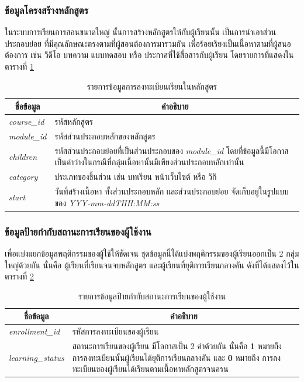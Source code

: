 \documentclass[conference]{IEEEtran}
\def\moocs{การเรียนการสอนขนาดใหญ่}
\def\MOOCs{ระบบ{\moocs}}
\def\dropout{ยุติการเรียนกลางคัน}
\newcommand*{\thead}[1]{\multicolumn{1}{c}{\bfseries #1}}
\begin{document}
    \subsubsection{ข้อมูลโครงสร้างหลักสูตร}
    ใน{\MOOCs} นั้นการสร้างหลักสูตรให้กับผู้เรียนนั้น เป็นการนำเอาส่วนประกอบย่อย 
    ที่มีคุณลักษณะตรงตามที่ผู้สอนต้องการมารวมกัน เพื่อร้อยเรียงเป็นเนื้อหาตามที่ผู้สนอต้องการ
    เช่น วีดีโอ บทความ แบบทดสอบ หรือ ประกาศที่ใช้สื่อสารกับผู้เรียน 
    โดยรายการที่แสดงในตารางที่ \ref{tab:course-structure-feature}

    \begin{table}[ht!]
        \caption[coursestructureinfo]{รายการข้อมูลการลงทะเบียนเรียนในหลักสูตร}
        \label{tab:course-structure-feature}
        \begin{tabular}{p{3cm} p{5cm}}
            \hline
            \thead{ชื่อข้อมูล} & \thead{คำอธิบาย} \\
            \hline
            \textit{course\_id}     & รหัสหลักสูตร \\
            \textit{module\_id}     & รหัสส่วนประกอบหลักของหลักสูตร \\
            \textit{children}       & รหัสส่วนประกอบย่อยที่เป็นส่วนประกอบของ \textit{module\_id} โดยที่ข้อมูลนี้มีโอกาสเป็นค่าว่างในกรณีที่กลุ่มเนื้อหานั้นมีเพียงส่วนประกอบหลักเท่านั้น \\
            \textit{category}       & ประเภทของชิ้นส่วน เช่น บทเรียน หน้าเว็บไซต์ หรือ วิกิ \\
            \textit{start}          & วันที่สร้างเนื้อหา ทั้งส่วนประกอบหลัก และส่วนประกอบย่อย จัดเก็บอยู่ในรูปแบบของ \textit{YYY-mm-ddTHH:MM:ss}\\
            \hline
        \end{tabular}
    \end{table}

    \subsubsection{ข้อมูลป้ายกำกับสถานะการเรียนของผู้ใช้งาน}
    เพื่อแบ่งแยกข้อมูลพฤติกรรมของผู้ใช้ให้ชัดเจน ชุดข้อมูลนี้ได้แบ่งพฤติกรรมของผู้เรียนออกเป็น 2 กลุ่มใหญ่ด้วยกัน นั่นคือ ผู้เรียนที่เรียนจนจบหลักสูตร
    และผู้เรียนที่{\dropout} ดังที่ได้แสดงไว้ในตารางที่ \ref{tab:enrollment-label-feature}
    \begin{table}[ht!]
        \caption[enrollmentlabelinfo]{รายการข้อมูลป้ายกำกับสถานะการเรียนของผู้ใช้งาน}
        \label{tab:enrollment-label-feature}
        \begin{tabular}{p{3cm} p{5cm}}
            \hline
            \thead{ชื่อข้อมูล} & \thead{คำอธิบาย} \\
            \hline
            \textit{enrollment\_id}     & รหัสการลงทะเบียนของผู้เรียน \\
            \textit{learning\_status}   & 
                สถานะการเรียนของผู้เรียน มีโอกาสเป็น 2 ค่าด้วยกัน นั่นคือ \textbf{1} หมายถึง การลงทะเบียนนั้นผู้เรียนได้{\dropout} และ 
                \textbf{0} หมายถึง การลงทะเบียนของผู้เรียนได้เรียนตามเนื้อหาหลักสูตรจนครน \\
            \hline
        \end{tabular}
    \end{table}
\end{document}
